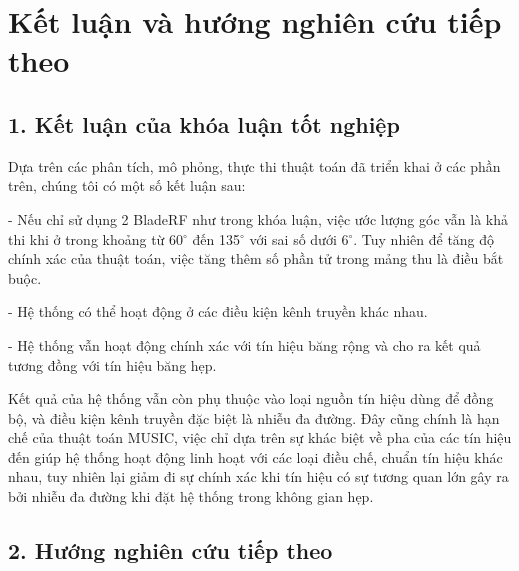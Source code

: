
\chapter*{Kết luận và hướng nghiên cứu tiếp theo}
\section*{1. Kết luận của khóa luận tốt nghiệp}
Dựa trên các phân tích, mô phỏng, thực thi thuật toán đã triển khai ở các phần trên, chúng tôi có một số kết luận sau:

- Nếu chỉ sử dụng 2 BladeRF như trong khóa luận, việc ước lượng góc vẫn là khả thi khi ở trong khoảng từ 60$^{\circ}$ đến 135$^{\circ}$ với sai số dưới 6$^{\circ}$. Tuy nhiên để tăng độ chính xác của thuật toán, việc tăng thêm số phần tử trong mảng thu là điều bắt buộc.

- Hệ thống có thể hoạt động ở các điều kiện kênh truyền khác nhau.

- Hệ thống vẫn hoạt động chính xác với tín hiệu băng rộng và cho ra kết quả tương đồng với tín hiệu băng hẹp.

Kết quả của hệ thống vẫn còn phụ thuộc vào loại nguồn tín hiệu dùng để đồng bộ, và điều kiện kênh truyền đặc biệt là nhiễu đa đường. Đây cũng chính là hạn chế của thuật toán MUSIC, việc chỉ dựa trên sự khác biệt về pha của các tín hiệu đến giúp hệ thống hoạt động linh hoạt với các loại điều chế, chuẩn tín hiệu khác nhau, tuy nhiên lại giảm đi sự chính xác khi tín hiệu có sự tương quan lớn gây ra bởi nhiễu đa đường khi đặt hệ thống trong không gian hẹp.

\section*{2. Hướng nghiên cứu tiếp theo}

